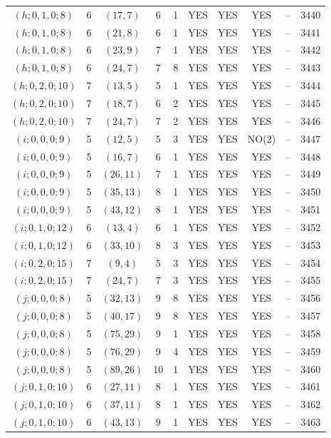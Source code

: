 \begin{longtable}{|c|c|c|c|c|c|c|c|c|c|}
$(h; 0, 1, 0; 8)$ & 6 & $(17, 7)$ & 6 & 1 & YES & YES & YES & -- & 3440\\
$(h; 0, 1, 0; 8)$ & 6 & $(21, 8)$ & 6 & 1 & YES & YES & YES & -- & 3441\\
$(h; 0, 1, 0; 8)$ & 6 & $(23, 9)$ & 7 & 1 & YES & YES & YES & -- & 3442\\
$(h; 0, 1, 0; 8)$ & 6 & $(24, 7)$ & 7 & 8 & YES & YES & YES & -- & 3443\\
$(h; 0, 2, 0; 10)$ & 7 & $(13, 5)$ & 5 & 1 & YES & YES & YES & -- & 3444\\
$(h; 0, 2, 0; 10)$ & 7 & $(18, 7)$ & 6 & 2 & YES & YES & YES & -- & 3445\\
$(h; 0, 2, 0; 10)$ & 7 & $(24, 7)$ & 7 & 2 & YES & YES & YES & -- & 3446\\
$(i; 0, 0, 0; 9)$ & 5 & $(12, 5)$ & 5 & 3 & YES & YES & NO(2) & -- & 3447\\
$(i; 0, 0, 0; 9)$ & 5 & $(16, 7)$ & 6 & 1 & YES & YES & YES & -- & 3448\\
$(i; 0, 0, 0; 9)$ & 5 & $(26, 11)$ & 7 & 1 & YES & YES & YES & -- & 3449\\
$(i; 0, 0, 0; 9)$ & 5 & $(35, 13)$ & 8 & 1 & YES & YES & YES & -- & 3450\\
$(i; 0, 0, 0; 9)$ & 5 & $(43, 12)$ & 8 & 1 & YES & YES & YES & -- & 3451\\
$(i; 0, 1, 0; 12)$ & 6 & $(13, 4)$ & 6 & 1 & YES & YES & YES & -- & 3452\\
$(i; 0, 1, 0; 12)$ & 6 & $(33, 10)$ & 8 & 3 & YES & YES & YES & -- & 3453\\
$(i; 0, 2, 0; 15)$ & 7 & $(9, 4)$ & 5 & 3 & YES & YES & YES & -- & 3454\\
$(i; 0, 2, 0; 15)$ & 7 & $(24, 7)$ & 7 & 3 & YES & YES & YES & -- & 3455\\
$(j; 0, 0, 0; 8)$ & 5 & $(32, 13)$ & 9 & 8 & YES & YES & YES & -- & 3456\\
$(j; 0, 0, 0; 8)$ & 5 & $(40, 17)$ & 9 & 8 & YES & YES & YES & -- & 3457\\
$(j; 0, 0, 0; 8)$ & 5 & $(75, 29)$ & 9 & 1 & YES & YES & YES & -- & 3458\\
$(j; 0, 0, 0; 8)$ & 5 & $(76, 29)$ & 9 & 4 & YES & YES & YES & -- & 3459\\
$(j; 0, 0, 0; 8)$ & 5 & $(89, 26)$ & 10 & 1 & YES & YES & YES & -- & 3460\\
$(j; 0, 1, 0; 10)$ & 6 & $(27, 11)$ & 8 & 1 & YES & YES & YES & -- & 3461\\
$(j; 0, 1, 0; 10)$ & 6 & $(37, 11)$ & 8 & 1 & YES & YES & YES & -- & 3462\\
$(j; 0, 1, 0; 10)$ & 6 & $(43, 13)$ & 9 & 1 & YES & YES & YES & -- & 3463
\end{longtable}
